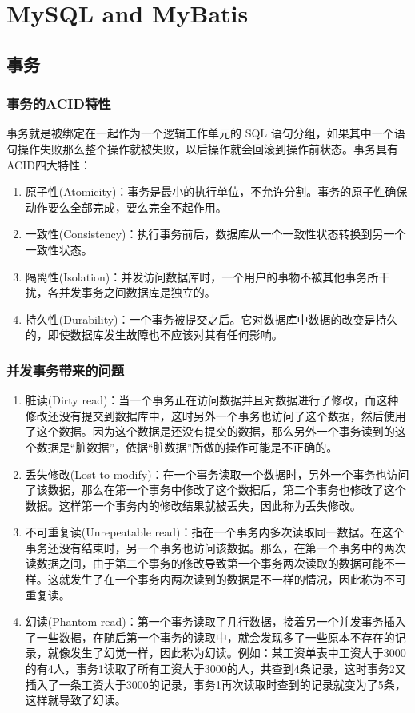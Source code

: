 \documentclass[main.tex]{subfiles}
\begin{document}
\chapter{MySQL and MyBatis}
\section{事务}
\subsection{事务的ACID特性}
事务就是被绑定在一起作为一个逻辑工作单元的 SQL 语句分组，如果其中一个语句操作失败那么整个操作就被失败，以后操作就会回滚到操作前状态。事务具有ACID四大特性：
\begin{enumerate}
    \item 原子性(Atomicity)：事务是最小的执行单位，不允许分割。事务的原子性确保动作要么全部完成，要么完全不起作用。
    \item 一致性(Consistency)：执行事务前后，数据库从一个一致性状态转换到另一个一致性状态。
    \item 隔离性(Isolation)：并发访问数据库时，一个用户的事物不被其他事务所干扰，各并发事务之间数据库是独立的。
    \item 持久性(Durability)：一个事务被提交之后。它对数据库中数据的改变是持久的，即使数据库发生故障也不应该对其有任何影响。
\end{enumerate}

\subsection{并发事务带来的问题}
\begin{enumerate}
    \item 脏读(Dirty read)：当一个事务正在访问数据并且对数据进行了修改，而这种修改还没有提交到数据库中，这时另外一个事务也访问了这个数据，然后使用了这个数据。因为这个数据是还没有提交的数据，那么另外一个事务读到的这个数据是“脏数据”，依据“脏数据”所做的操作可能是不正确的。
    \item 丢失修改(Lost to modify)：在一个事务读取一个数据时，另外一个事务也访问了该数据，那么在第一个事务中修改了这个数据后，第二个事务也修改了这个数据。这样第一个事务内的修改结果就被丢失，因此称为丢失修改。
    \item 不可重复读(Unrepeatable read)：指在一个事务内多次读取同一数据。在这个事务还没有结束时，另一个事务也访问该数据。那么，在第一个事务中的两次读数据之间，由于第二个事务的修改导致第一个事务两次读取的数据可能不一样。这就发生了在一个事务内两次读到的数据是不一样的情况，因此称为不可重复读。
    \item 幻读(Phantom read)：第一个事务读取了几行数据，接着另一个并发事务插入了一些数据，在随后第一个事务的读取中，就会发现多了一些原本不存在的记录，就像发生了幻觉一样，因此称为幻读。例如：某工资单表中工资大于3000的有4人，事务1读取了所有工资大于3000的人，共查到4条记录，这时事务2又插入了一条工资大于3000的记录，事务1再次读取时查到的记录就变为了5条，这样就导致了幻读。
\end{enumerate}
\end{document}
